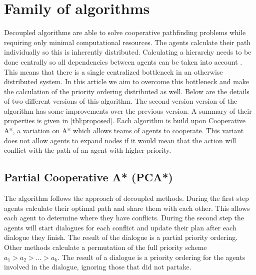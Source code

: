 \section{Family of algorithms}\label{sec:method}
Decoupled algorithms are able to solve cooperative pathfinding problems while
requiring only minimal computational resources. The agents calculate their path
individually so this is inherently distributed. Calculating a hierarchy needs
to be done centrally so all dependencies between agents can be taken into
account \citep{latombe1991,bennewitz2002}. This means that there is a single
centralized bottleneck in an otherwise distributed system. In this article we
aim to overcome this bottleneck and make the calculation of the priority
ordering distributed as well. Below are the details of two different versions
of this algorithm. The second version version of the algorithm has some
improvements over the previous version. A summary of their properties is given
in \autoref{tbl:proposed}. Each algorithm is build upon Cooperative A*, a
variation on A* \citep{hart1968} which allows teams of agents to cooperate.
This variant does not allow agents to expand nodes if it would mean that the
action will conflict with the path of an agent with higher priority.


\subsection{Partial Cooperative A* (PCA*)}
The algorithm follows the approach of decoupled methods. During the first step
agents calculate their optimal path and share them with each other. This allows
each agent to determine where they have conflicts. During the second step the
agents will start dialogues for each conflict and update their plan after each
dialogue they finish. The result of the dialogue is a partial priority
ordering. Other methods calculate a permutation of the full priority scheme
$a_1 > a_2 > \ldots > a_k$. The result of a dialogue is a priority ordering for
the agents involved in the dialogue, ignoring those that did not partake.

